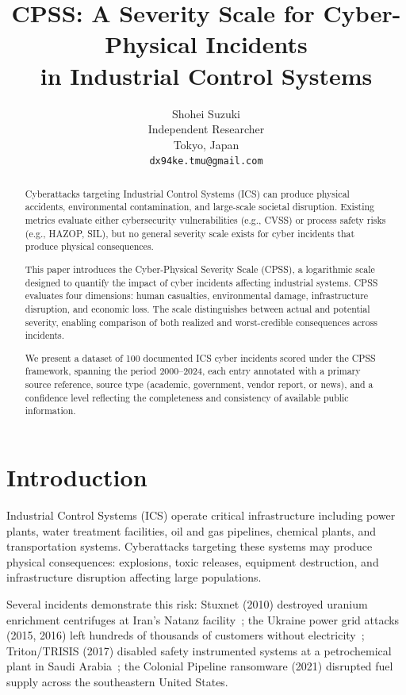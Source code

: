 \documentclass[11pt]{article}
\title{CPSS: A Severity Scale for Cyber-Physical Incidents\\
in Industrial Control Systems}
\author{
  Shohei Suzuki \\
  Independent Researcher \\
  Tokyo, Japan \\
  \texttt{dx94ke.tmu@gmail.com} \\
}
\begin{document}
\maketitle

\begin{abstract}
Cyberattacks targeting Industrial Control Systems (ICS) can produce
physical accidents, environmental contamination, and large-scale
societal disruption. Existing metrics evaluate either cybersecurity
vulnerabilities (e.g., CVSS) or process safety risks (e.g., HAZOP, SIL),
but no general severity scale exists for cyber incidents that produce
physical consequences.

This paper introduces the Cyber-Physical Severity Scale (CPSS),
a logarithmic scale designed to quantify the impact of cyber incidents
affecting industrial systems. CPSS evaluates four dimensions:
human casualties, environmental damage, infrastructure disruption,
and economic loss. The scale distinguishes between actual and potential
severity, enabling comparison of both realized and worst-credible
consequences across incidents.

We present a dataset of 100 documented ICS cyber incidents scored
under the CPSS framework, spanning the period 2000--2024,
each entry annotated with a primary source reference,
source type (academic, government, vendor report, or news),
and a confidence level reflecting the completeness and
consistency of available public information.
\end{abstract}

\section{Introduction}

Industrial Control Systems (ICS) operate critical infrastructure
including power plants, water treatment facilities, oil and gas
pipelines, chemical plants, and transportation systems.
Cyberattacks targeting these systems may produce physical consequences:
explosions, toxic releases, equipment destruction, and infrastructure
disruption affecting large populations.

Several incidents demonstrate this risk:
Stuxnet (2010) destroyed uranium enrichment centrifuges at Iran's
Natanz facility~\cite{langner};
the Ukraine power grid attacks (2015, 2016) left hundreds of thousands
of customers without electricity~\cite{eisac};
Triton/TRISIS (2017) disabled safety instrumented systems at a
petrochemical plant in Saudi Arabia~\cite{fireeye};
the Colonial Pipeline ransomware (2021) disrupted fuel supply across
the southeastern United States.
\end{document}
